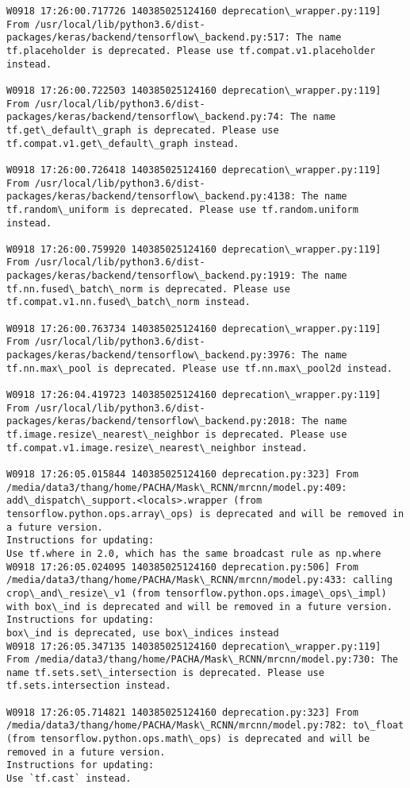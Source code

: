 \documentclass[11pt]{article}
\begin{document}
    \begin{Verbatim}[commandchars=\\\{\}]
W0918 17:26:00.717726 140385025124160 deprecation\_wrapper.py:119] From /usr/local/lib/python3.6/dist-packages/keras/backend/tensorflow\_backend.py:517: The name tf.placeholder is deprecated. Please use tf.compat.v1.placeholder instead.

W0918 17:26:00.722503 140385025124160 deprecation\_wrapper.py:119] From /usr/local/lib/python3.6/dist-packages/keras/backend/tensorflow\_backend.py:74: The name tf.get\_default\_graph is deprecated. Please use tf.compat.v1.get\_default\_graph instead.

W0918 17:26:00.726418 140385025124160 deprecation\_wrapper.py:119] From /usr/local/lib/python3.6/dist-packages/keras/backend/tensorflow\_backend.py:4138: The name tf.random\_uniform is deprecated. Please use tf.random.uniform instead.

W0918 17:26:00.759920 140385025124160 deprecation\_wrapper.py:119] From /usr/local/lib/python3.6/dist-packages/keras/backend/tensorflow\_backend.py:1919: The name tf.nn.fused\_batch\_norm is deprecated. Please use tf.compat.v1.nn.fused\_batch\_norm instead.

W0918 17:26:00.763734 140385025124160 deprecation\_wrapper.py:119] From /usr/local/lib/python3.6/dist-packages/keras/backend/tensorflow\_backend.py:3976: The name tf.nn.max\_pool is deprecated. Please use tf.nn.max\_pool2d instead.

W0918 17:26:04.419723 140385025124160 deprecation\_wrapper.py:119] From /usr/local/lib/python3.6/dist-packages/keras/backend/tensorflow\_backend.py:2018: The name tf.image.resize\_nearest\_neighbor is deprecated. Please use tf.compat.v1.image.resize\_nearest\_neighbor instead.

W0918 17:26:05.015844 140385025124160 deprecation.py:323] From /media/data3/thang/home/PACHA/Mask\_RCNN/mrcnn/model.py:409: add\_dispatch\_support.<locals>.wrapper (from tensorflow.python.ops.array\_ops) is deprecated and will be removed in a future version.
Instructions for updating:
Use tf.where in 2.0, which has the same broadcast rule as np.where
W0918 17:26:05.024095 140385025124160 deprecation.py:506] From /media/data3/thang/home/PACHA/Mask\_RCNN/mrcnn/model.py:433: calling crop\_and\_resize\_v1 (from tensorflow.python.ops.image\_ops\_impl) with box\_ind is deprecated and will be removed in a future version.
Instructions for updating:
box\_ind is deprecated, use box\_indices instead
W0918 17:26:05.347135 140385025124160 deprecation\_wrapper.py:119] From /media/data3/thang/home/PACHA/Mask\_RCNN/mrcnn/model.py:730: The name tf.sets.set\_intersection is deprecated. Please use tf.sets.intersection instead.

W0918 17:26:05.714821 140385025124160 deprecation.py:323] From /media/data3/thang/home/PACHA/Mask\_RCNN/mrcnn/model.py:782: to\_float (from tensorflow.python.ops.math\_ops) is deprecated and will be removed in a future version.
Instructions for updating:
Use `tf.cast` instead.

    \end{Verbatim}
\end{document}
